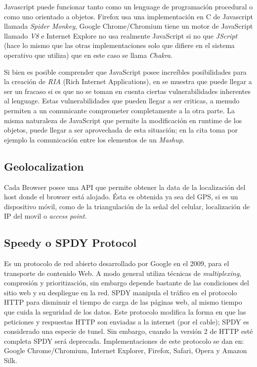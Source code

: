     Javascript puede funcionar tanto como un lenguage de programación procedural o como uno orientado a objetos. Firefox usa una implementación en C de Javascript llamada \textit{Spider Monkey}, Google Chrome/Chromium tiene un motor de JavaScript llamado \textit{V8} e Internet Explore no usa realmente JavaScript si no que \textit{JScript} (hace lo mismo que las otras implementaciones solo que difiere en el sistema operativo que utiliza) que en este caso se llama \textit{Chakra}.
            
    Si bien es posible comprender que JavaScript posee increíbles posibilidades para la creación de \textit{RIA} (Rich Internet Applications), en \cite{barth2009attacks} se muestra que puede llegar a ser un fracaso si es que no se toman en cuenta ciertas vulnerabilidades inherentes al lenguage. Estas vulnerabilidades que pueden llegar a ser criticas, a menudo permiten a un comunicante comprometer completamente a la otra parte. La misma naturaleza de JavaScript que permite la modificación en runtime de los objetos, puede llegar a ser aprovechada de esta situación; en la cita toma por ejemplo la comunicación entre los elementos de un \textit{Mashup}.


    \subsection{Geolocalization}
    Cada Browser posee una API que permite obtener la data de la localización del host donde el browser está alojado. Ésta es obtenida ya sea del GPS, si es un dispositivo móvil, como de la triangulación de la señal del celular, localización de IP del movil o \textit{access point}.


    \subsection{Speedy o SPDY Protocol}
    \label{chap2:spdy}
    Es un protocolo de red abierto desarrollado por Google en el 2009, para el transporte de contenido Web. A modo general utiliza técnicas de \textit{multiplexing}, compresión y prioritización, sin embargo depende bastante de las condiciones del sitio web y su despliegue en la red. SPDY manipula el tráfico en el protocolo HTTP para disminuir el tiempo de carga de las páginas web, al mismo tiempo que cuida la seguridad de los datos. Este protocolo modifica la forma en que las peticiones y respuestas HTTP son enviadas a la internet (por el cable); SPDY es considerado una especie de tunel. Sin embargo, cuando la versión 2 de HTTP esté completa SPDY será deprecada. Implementaciones de este protocolo se dan en: Google Chrome/Chromium, Internet Explorer, Firefox, Safari, Opera y Amazon Silk.

